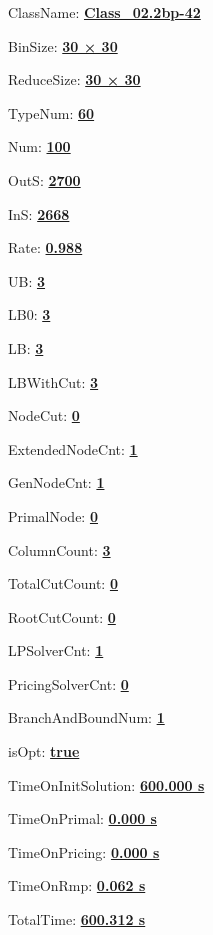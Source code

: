 \documentclass[11pt]{article}
\begin{document}
\pagestyle{empty}


ClassName: \underline{\textbf{Class_02.2bp-42}}
\par
BinSize: \underline{\textbf{30 × 30}}
\par
ReduceSize: \underline{\textbf{30 × 30}}
\par
TypeNum: \underline{\textbf{60}}
\par
Num: \underline{\textbf{100}}
\par
OutS: \underline{\textbf{2700}}
\par
InS: \underline{\textbf{2668}}
\par
Rate: \underline{\textbf{0.988}}
\par
UB: \underline{\textbf{3}}
\par
LB0: \underline{\textbf{3}}
\par
LB: \underline{\textbf{3}}
\par
LBWithCut: \underline{\textbf{3}}
\par
NodeCut: \underline{\textbf{0}}
\par
ExtendedNodeCnt: \underline{\textbf{1}}
\par
GenNodeCnt: \underline{\textbf{1}}
\par
PrimalNode: \underline{\textbf{0}}
\par
ColumnCount: \underline{\textbf{3}}
\par
TotalCutCount: \underline{\textbf{0}}
\par
RootCutCount: \underline{\textbf{0}}
\par
LPSolverCnt: \underline{\textbf{1}}
\par
PricingSolverCnt: \underline{\textbf{0}}
\par
BranchAndBoundNum: \underline{\textbf{1}}
\par
isOpt: \underline{\textbf{true}}
\par
TimeOnInitSolution: \underline{\textbf{600.000 s}}
\par
TimeOnPrimal: \underline{\textbf{0.000 s}}
\par
TimeOnPricing: \underline{\textbf{0.000 s}}
\par
TimeOnRmp: \underline{\textbf{0.062 s}}
\par
TotalTime: \underline{\textbf{600.312 s}}
\par
\newpage
\end{document}
